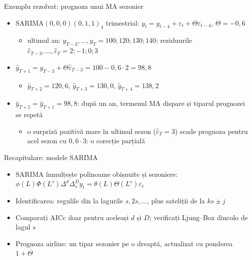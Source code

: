 \begin{frame}{Exemplu rezolvat: prognoza unui MA sezonier}
\itemsize{\small}
\begin{itemize}
    \item SARIMA$(0,0,0)(0,1,1)_4$ trimestrial: $y_t = y_{t-4} + \varepsilon_t + \Theta\varepsilon_{t-4}$, $\Theta = -0{,}6$
    \begin{itemize}
        \item ultimul an: $y_{T-3}, \dots, y_T = 100; 120; 130; 140$; reziduurile $\hat\varepsilon_{T-3}, \dots, \hat\varepsilon_T = 2; -1; 0; 3$
    \end{itemize}
    \item $\hat y_{T+1} = y_{T-3} + \Theta\hat\varepsilon_{T-3} = 100 - 0{,}6 \cdot 2 = 98{,}8$
    \begin{itemize}
        \item $\hat y_{T+2} = 120{,}6$, $\hat y_{T+3} = 130{,}0$, $\hat y_{T+4} = 138{,}2$
    \end{itemize}
    \item $\hat y_{T+5} = \hat y_{T+1} = 98{,}8$: după un an, termenul MA dispare și tiparul prognozei se repetă
    \begin{itemize}
        \item o surpriză pozitivă mare în ultimul sezon ($\hat\varepsilon_T = 3$) scade prognoza pentru acel sezon cu $0{,}6 \cdot 3$: o corecție parțială
    \end{itemize}
\end{itemize}
\end{frame}

\begin{frame}{Recapitulare: modele SARIMA}
\itemsize{\small}
\begin{itemize}
    \item SARIMA înmulțește polinoame obișnuite și sezoniere: $\phi(L)\Phi(L^s)\Delta^d\Delta_s^Dy_t = \theta(L)\Theta(L^s)\varepsilon_t$
    \item Identificarea: regulile din  la lagurile $s, 2s, \dots$, plus sateliții de la $ks \pm j$
    \item Comparați AICc doar pentru aceleași $d$ și $D$; verificați Ljung--Box dincolo de lagul $s$
    \item Prognoza airline: un tipar sezonier pe o dreaptă, actualizat cu ponderea $1 + \Theta$
\end{itemize}
\end{frame}



